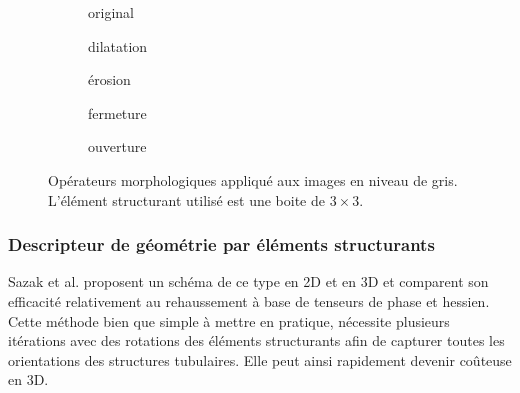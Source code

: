  \begin{figure}
  \begin{subfigure}[t]{0.30\textwidth}
    \centering
    \caption{original}
  \end{subfigure}
  \begin{subfigure}[t]{0.30\textwidth}
    \centering
    \caption{dilatation}
  \end{subfigure}
  \begin{subfigure}[t]{0.30\textwidth}
    \centering
    \caption{érosion}
  \end{subfigure}
  \centering
  \begin{subfigure}[t]{0.30\textwidth}
    \centering
    \caption{fermeture}
  \end{subfigure}
  \begin{subfigure}[t]{0.30\textwidth}
    \centering
    \caption{ouverture}
  \end{subfigure}  
  \caption{Opérateurs morphologiques appliqué aux images en niveau de gris. L'élément structurant utilisé est une boite de $3\times3$.}
  \label{fig:greyscale_morpho}
\end{figure}

\subsubsection{Descripteur de géométrie par éléments structurants}
\label{sec:EA:rehaussement:morpho}

 Sazak et al. proposent un schéma de ce type en 2D \cite{Sazak2019_bowler_hat_2D} et en 3D \cite{Sazak2018_bowler_hat_3D} et comparent son efficacité relativement au rehaussement à base de tenseurs de phase et hessien. Cette méthode bien que simple à mettre en pratique, nécessite plusieurs itérations avec des rotations des éléments structurants afin de capturer toutes les orientations des structures tubulaires. Elle peut ainsi rapidement devenir coûteuse en 3D.

